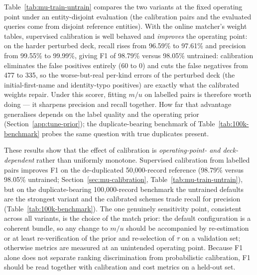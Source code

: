 \documentclass[11pt]{article}
\begin{document}
Table~\ref{tab:mu-train-untrain} compares the two variants at the fixed operating point under an entity-disjoint evaluation (the calibration pairs and the evaluated queries come from disjoint reference entities). With the online matcher's weight tables, supervised calibration is well behaved and \emph{improves} the operating point: on the harder perturbed deck, recall rises from 96.59\% to 97.61\% and precision from 99.55\% to 99.99\%, giving F1 of 98.79\% versus 98.05\% untrained: calibration eliminates the false positives entirely (60 to 0) and cuts the false negatives from 477 to 335, so the worse-but-real per-kind errors of the perturbed deck (the initial-first-name and identity-typo positives) are exactly what the calibrated weights repair. Under this scorer, fitting $m/u$ on labelled pairs is therefore worth doing --- it sharpens precision and recall together. How far that advantage generalises depends on the label quality and the operating prior (Section~\ref{app:tune-prior}); the duplicate-bearing benchmark of Table~\ref{tab:100k-benchmark} probes the same question with true duplicates present.

These results show that the effect of calibration is \emph{operating-point- and deck-dependent} rather than uniformly monotone. Supervised calibration from labelled pairs improves F1 on the de-duplicated 50{,}000-record reference (98.79\% versus 98.05\% untrained; Section~\ref{sec:mu-calibration}, Table~\ref{tab:mu-train-untrain}), but on the duplicate-bearing 100{,}000-record benchmark the untrained defaults are the strongest variant and the calibrated schemes trade recall for precision (Table~\ref{tab:100k-benchmark}). The one genuinely sensitivity point, consistent across all variants, is the choice of the match prior: the default configuration is a coherent bundle, so any change to $m/u$ should be accompanied by re-estimation or at least re-verification of the prior and re-selection of $\tau$ on a validation set; otherwise metrics are measured at an unintended operating point. Because F1 alone does not separate ranking discrimination from probabilistic calibration, F1 should be read together with calibration and cost metrics on a held-out set.
\end{document}
